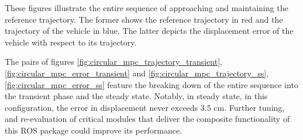 These figures illustrate the entire sequence of approaching and maintaining
the reference trajectory. The former shows the reference trajectory in red
and the trajectory of the vehicle in blue. The latter depicts the displacement
error of the vehicle with respect to its trajectory.

\noindent{}

The pairs of figures \ref{fig:circular_mpc_trajectory_transient}, \ref{fig:circular_mpc_error_transient}
and \ref{fig:circular_mpc_trajectory_ss}, \ref{fig:circular_mpc_error_ss}
feature the breaking down of the entire sequence into the transient phase
and the steady state. Notably, in steady state, in this configuration, the
error in displacement never exceeds $3.5$ cm. Further tuning, and re-evaluation
of critical modules that deliver the composite functionality of this ROS
package could improve its performance.



